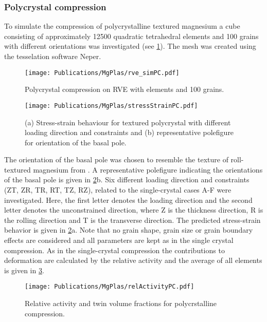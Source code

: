   \subsubsection{Polycrystal compression} \label{sec:PCcompression} %
  To simulate the compression of polycrystalline textured magnesium a cube consisting of approximately 12500 quadratic tetrahedral elements and 100 grains with different orientations was investigated (see \cref{fig:cubeCompression}). The mesh was created using the tesselation software Neper\supercite{quey2011neper,quey2022neper}.
  
  \begin{figure}[!ht]
    \texttt{[image: Publications/MgPlas/rve\_simPC.pdf]}
    \caption{Polycrystal compression on RVE with  elements and 100 grains.}
    \label{fig:cubeCompression}
  \end{figure}
  
  \begin{figure}[!ht]
    \centering
    \texttt{[image: Publications/MgPlas/stressStrainPC.pdf]}
    \caption{(a) Stress-strain behaviour for textured polycrystal with different loading direction and constraints and (b) representative polefigure for orientation of the basal pole.}
    \label{fig:stressStrainPC}
  \end{figure}
  
  The orientation of the basal pole was chosen to resemble the texture of roll-textured magnesium from . A representative polefigure indicating the orientations of the basal pole is given in \cref{fig:stressStrainPC}b. Six different loading direction and constraints (ZT, ZR, TR, RT, TZ, RZ), related to the single-crystal cases A-F were investigated. Here, the first letter denotes the loading direction and the second letter denotes the unconstrained direction, where Z is the thickness direction, R is the rolling direction and T is the transverse direction. The predicted stress-strain behavior is given in \cref{fig:stressStrainPC}a. Note that no grain shape, grain size or grain boundary effects are considered and all parameters are kept as in the single crystal compression. As in the single-crystal compression the contributions to deformation are calculated by the relative activity and the average of all elements is given in \cref{fig:relActPC}.
  
  \begin{figure}[!ht]
    \centering
    \texttt{[image: Publications/MgPlas/relActivityPC.pdf]}
    \caption{Relative activity and twin volume fractions for polycrstalline compression.}
    \label{fig:relActPC}
  \end{figure}
  
